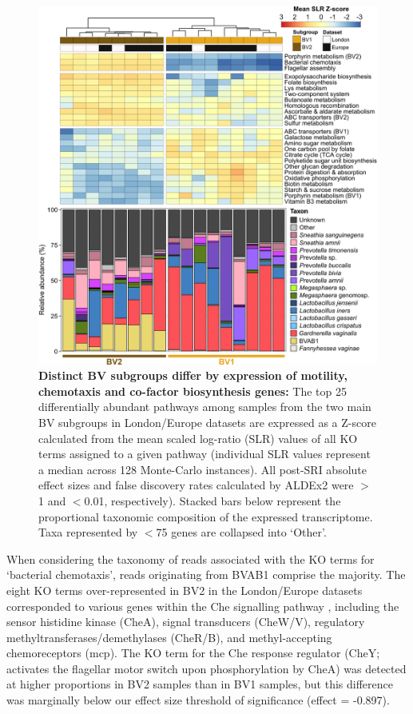 \documentclass[sn-mathphys,Numbered]{sn-jnl}%
\begin{document}
\begin{figure}[H]
    \centering
    \includegraphics[scale=1.2]{0_multipanel_fig3_revised.png}
    \caption{\textbf{Distinct BV subgroups differ by expression of motility, chemotaxis and co-factor biosynthesis genes:} The top 25 differentially abundant pathways among samples from the two main BV subgroups in London/Europe datasets are expressed as a Z-score calculated from the mean scaled log-ratio (SLR) values of all KO terms assigned to a given pathway (individual SLR values represent a median across 128 Monte-Carlo instances). All post-SRI absolute effect sizes and false discovery rates calculated by ALDEx2 were $>$1 and $<$0.01, respectively). Stacked bars below represent the proportional taxonomic composition of the expressed transcriptome. Taxa represented by $<$75 genes are collapsed into `Other'.}
    \label{fig:figLonEurBVsubG}
\end{figure}

When considering the taxonomy of reads associated with the KO terms for `bacterial chemotaxis', reads originating from BVAB1 comprise the majority. The eight KO terms over-represented in BV2 in the London/Europe datasets corresponded to various genes within the Che signalling pathway \citep{miller_diversity_2009}, including the sensor histidine kinase (CheA), signal transducers (CheW/V), regulatory methyltransferases/demethylases (CheR/B), and methyl-accepting chemoreceptors (mcp). The KO term for the Che response regulator (CheY; activates the flagellar motor switch upon phosphorylation by CheA) was detected at higher proportions in BV2 samples than in BV1 samples, but this difference was marginally below our effect size threshold of significance (effect = -0.897).
\end{document}
